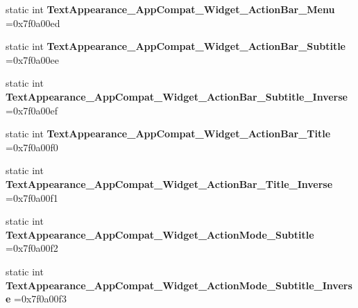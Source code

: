 \begin{DoxyCompactItemize}
\item 
\mbox{\label{classandroid_1_1support_1_1v7_1_1mediarouter_1_1R_1_1style_ae5d575d2e6373608fb842b5c4ea43abf}} 
static int {\bfseries Text\+Appearance\+\_\+\+App\+Compat\+\_\+\+Widget\+\_\+\+Action\+Bar\+\_\+\+Menu} =0x7f0a00ed
\item 
\mbox{\label{classandroid_1_1support_1_1v7_1_1mediarouter_1_1R_1_1style_a9c84dc8e77385151b73a7ccb06fb66d4}} 
static int {\bfseries Text\+Appearance\+\_\+\+App\+Compat\+\_\+\+Widget\+\_\+\+Action\+Bar\+\_\+\+Subtitle} =0x7f0a00ee
\item 
\mbox{\label{classandroid_1_1support_1_1v7_1_1mediarouter_1_1R_1_1style_a73ae6bb8c6ca03751f87a9957ea1aeff}} 
static int {\bfseries Text\+Appearance\+\_\+\+App\+Compat\+\_\+\+Widget\+\_\+\+Action\+Bar\+\_\+\+Subtitle\+\_\+\+Inverse} =0x7f0a00ef
\item 
\mbox{\label{classandroid_1_1support_1_1v7_1_1mediarouter_1_1R_1_1style_a5d62b5f601cc802ac44cd246a7ed2d14}} 
static int {\bfseries Text\+Appearance\+\_\+\+App\+Compat\+\_\+\+Widget\+\_\+\+Action\+Bar\+\_\+\+Title} =0x7f0a00f0
\item 
\mbox{\label{classandroid_1_1support_1_1v7_1_1mediarouter_1_1R_1_1style_abfc7f498c9b433e47c0c7ee9ef9fd126}} 
static int {\bfseries Text\+Appearance\+\_\+\+App\+Compat\+\_\+\+Widget\+\_\+\+Action\+Bar\+\_\+\+Title\+\_\+\+Inverse} =0x7f0a00f1
\item 
\mbox{\label{classandroid_1_1support_1_1v7_1_1mediarouter_1_1R_1_1style_aa8cad2d986086eb9e2d0805e329a6b6f}} 
static int {\bfseries Text\+Appearance\+\_\+\+App\+Compat\+\_\+\+Widget\+\_\+\+Action\+Mode\+\_\+\+Subtitle} =0x7f0a00f2
\item 
\mbox{\label{classandroid_1_1support_1_1v7_1_1mediarouter_1_1R_1_1style_a6c2fe31c22b34a31dba8df843e68c696}} 
static int {\bfseries Text\+Appearance\+\_\+\+App\+Compat\+\_\+\+Widget\+\_\+\+Action\+Mode\+\_\+\+Subtitle\+\_\+\+Inverse} =0x7f0a00f3

\end{DoxyCompactItemize}
